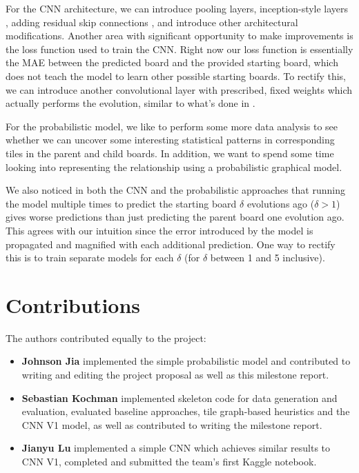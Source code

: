 \documentclass[conference]{IEEEtran}
\begin{document}
For the CNN architecture, we can introduce pooling layers, inception-style layers \cite{b3}, adding residual skip connections \cite{b4}, and introduce other architectural modifications. Another area with significant opportunity to make improvements is the loss function used to train the CNN. Right now our loss function is essentially the MAE between the predicted board and the provided starting board, which does not teach the model to learn other possible starting boards. To rectify this, we can introduce another convolutional layer with prescribed, fixed weights which actually performs the evolution, similar to what's done in \cite{b5}. 

For the probabilistic model, we like to perform some more data analysis to see whether we can uncover some interesting statistical patterns in corresponding tiles in the parent and child boards. In addition, we want to spend some time looking into representing the relationship using a probabilistic graphical model.

We also noticed in both the CNN and the probabilistic approaches that running the model multiple times to predict the starting board $\delta$ evolutions ago ($\delta > 1$) gives worse predictions than just predicting the parent board one evolution ago. This agrees with our intuition since the error introduced by the model is propagated and magnified with each additional prediction. One way to rectify this is to train separate models for each $\delta$ (for $\delta$ between 1 and 5 inclusive).

\section{Contributions}
The authors contributed equally to the project: %
\begin{itemize}
    \item \textbf{Johnson Jia} implemented the simple probabilistic model and contributed to writing and editing the project proposal as well as this milestone report.

    \item \textbf{Sebastian Kochman} implemented skeleton code for data generation and evaluation, evaluated baseline approaches, tile graph-based heuristics and the CNN V1 model, as well as contributed to writing the milestone report.

    \item \textbf{Jianyu Lu} implemented a simple CNN which achieves similar results to CNN V1, completed and submitted the team's first Kaggle notebook.

\end{itemize}
\end{document}
